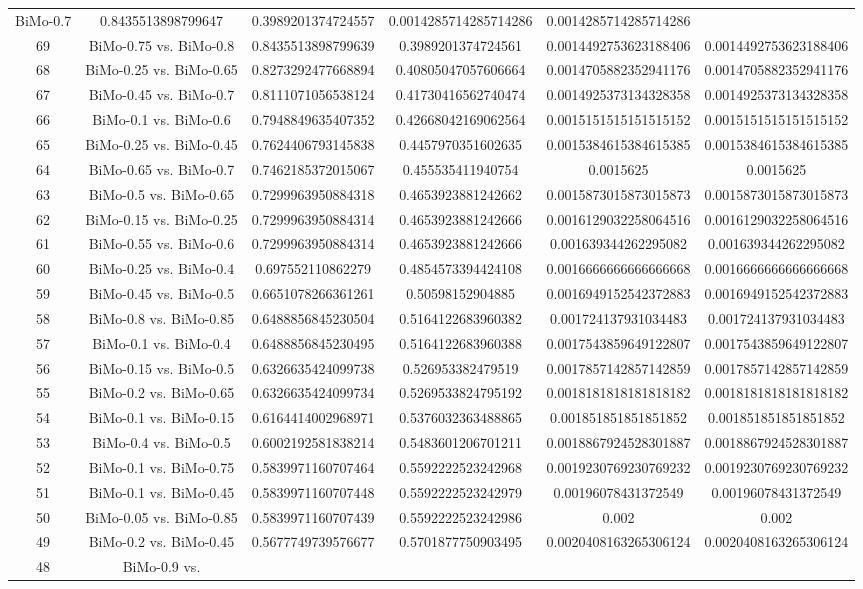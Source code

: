 \documentclass[a4paper,10pt]{article}
\begin{document}
\begin{landscape}
\begin{table}[!htp]
\begin{tabular}{cccccc}
BiMo-0.7&0.8435513898799647&0.3989201374724557&0.0014285714285714286&0.0014285714285714286\\69&BiMo-0.75 vs. BiMo-0.8&0.8435513898799639&0.3989201374724561&0.0014492753623188406&0.0014492753623188406\\68&BiMo-0.25 vs. BiMo-0.65&0.8273292477668894&0.40805047057606664&0.0014705882352941176&0.0014705882352941176\\67&BiMo-0.45 vs. BiMo-0.7&0.8111071056538124&0.41730416562740474&0.0014925373134328358&0.0014925373134328358\\66&BiMo-0.1 vs. BiMo-0.6&0.7948849635407352&0.42668042169062564&0.0015151515151515152&0.0015151515151515152\\65&BiMo-0.25 vs. BiMo-0.45&0.7624406793145838&0.4457970351602635&0.0015384615384615385&0.0015384615384615385\\64&BiMo-0.65 vs. BiMo-0.7&0.7462185372015067&0.455535411940754&0.0015625&0.0015625\\63&BiMo-0.5 vs. BiMo-0.65&0.7299963950884318&0.4653923881242662&0.0015873015873015873&0.0015873015873015873\\62&BiMo-0.15 vs. BiMo-0.25&0.7299963950884314&0.4653923881242666&0.0016129032258064516&0.0016129032258064516\\61&BiMo-0.55 vs. BiMo-0.6&0.7299963950884314&0.4653923881242666&0.001639344262295082&0.001639344262295082\\60&BiMo-0.25 vs. BiMo-0.4&0.697552110862279&0.4854573394424108&0.0016666666666666668&0.0016666666666666668\\59&BiMo-0.45 vs. BiMo-0.5&0.6651078266361261&0.50598152904885&0.0016949152542372883&0.0016949152542372883\\58&BiMo-0.8 vs. BiMo-0.85&0.6488856845230504&0.5164122683960382&0.001724137931034483&0.001724137931034483\\57&BiMo-0.1 vs. BiMo-0.4&0.6488856845230495&0.5164122683960388&0.0017543859649122807&0.0017543859649122807\\56&BiMo-0.15 vs. BiMo-0.5&0.6326635424099738&0.526953382479519&0.0017857142857142859&0.0017857142857142859\\55&BiMo-0.2 vs. BiMo-0.65&0.6326635424099734&0.5269533824795192&0.0018181818181818182&0.0018181818181818182\\54&BiMo-0.1 vs. BiMo-0.15&0.6164414002968971&0.5376032363488865&0.001851851851851852&0.001851851851851852\\53&BiMo-0.4 vs. BiMo-0.5&0.6002192581838214&0.5483601206701211&0.0018867924528301887&0.0018867924528301887\\52&BiMo-0.1 vs. BiMo-0.75&0.5839971160707464&0.5592222523242968&0.0019230769230769232&0.0019230769230769232\\51&BiMo-0.1 vs. BiMo-0.45&0.5839971160707448&0.5592222523242979&0.00196078431372549&0.00196078431372549\\50&BiMo-0.05 vs. BiMo-0.85&0.5839971160707439&0.5592222523242986&0.002&0.002\\49&BiMo-0.2 vs. BiMo-0.45&0.5677749739576677&0.5701877750903495&0.0020408163265306124&0.0020408163265306124\\48&BiMo-0.9 vs. 
\end{tabular}
\end{table}
\end{landscape}
\end{document}
